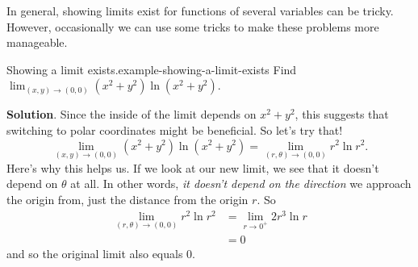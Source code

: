 \documentclass[10pt,]{book}
\numberwithin{equation}{section}
\begin{document}
\hypertarget{p-1345}{}%
In general, showing limits exist for functions of several variables can be tricky. However, occasionally we can use some tricks to make these problems more manageable.%
\begin{example}{Showing a limit exists.}{example-showing-a-limit-exists}%
\hypertarget{p-1346}{}%
Find \(\lim_{(x,y)\to(0,0)}(x^{2}+y^{2})\ln(x^{2}+y^{2})\).%
\par\smallskip%
\noindent\textbf{Solution}.\hypertarget{solution-215}{}\quad%
\hypertarget{p-1347}{}%
Since the inside of the limit depends on \(x^{2}+y^{2}\), this suggests that switching to polar coordinates might be beneficial. So let's try that!%
\begin{equation*}
\lim_{(x,y)\to(0,0)}(x^{2}+y^{2})\ln(x^{2}+y^{2}) = \lim_{(r,\theta)\to(0,0)}r^{2}\ln r^{2}.
\end{equation*}
Here's why this helps us. If we look at our new limit, we see that it doesn't depend on \(\theta\) at all. In other words, \emph{it doesn't depend on the direction} we approach the origin from, just the distance from the origin \(r\). So%
\begin{align*}
\lim_{(r,\theta)\to(0,0)}r^{2}\ln r^{2} & = \lim_{r\to0^{+}} 2r^{3}\ln r \\
& = 0 
\end{align*}
and so the original limit also equals \(0\).%
\end{example}
%
%
\typeout{************************************************}
\typeout{************************************************}
%
\end{document}
